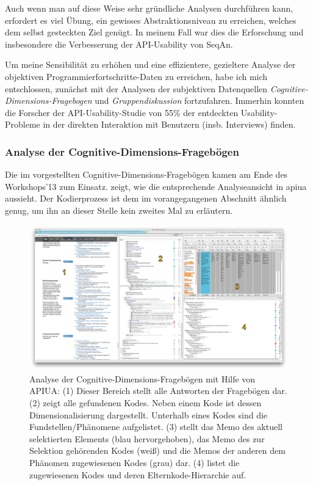 Auch wenn man auf diese Weise sehr gründliche Analysen durchführen kann, erfordert es viel Übung, ein gewisses Abstraktionsniveau zu erreichen, welches dem selbst gesteckten Ziel genügt. In meinem Fall war dies die Erforschung und insbesondere die Verbesserung der API-Usability von SeqAn.

Um meine Sensibilität zu erhöhen und eine effizientere, gezieltere Analyse der objektiven Programmierfortschritte-Daten zu erreichen, habe ich mich entschlossen, zunächst mit der Analysen der subjektiven Datenquellen \textit{Cognitive-Dimensions-Fragebogen} und \textit{Gruppendiskussion} fortzufahren. Immerhin konnten die Forscher der API-Usability-Studie von \cite{Grill:2012jm} 55\% der entdeckten Usability-Probleme in der direkten Interaktion mit Benutzern (insb. Interviews) finden.



\subsubsection{Analyse der Cognitive-Dimensions-Fragebögen}

Die im  vorgestellten Cognitive-Dimensions-Fragebögen kamen am Ende des Workshops'13 zum Einsatz.  zeigt, wie die entsprechende Analyseansicht in \gls{apiua} aussieht. Der Kodierprozess ist dem im vorangegangenen Abschnitt ähnlich genug, um ihn an dieser Stelle kein zweites Mal zu erläutern.

\begin{figure}
  \centering
    \includegraphics[width=1.0\linewidth]{Figures/research/workflow-cdf.png}
  \caption[Analyse der Cognitive-Dimensions-Fragebögen mit Hilfe von APIUA]{Analyse der Cognitive-Dimensions-Fragebögen mit Hilfe von APIUA: (1) Dieser Bereich stellt alle Antworten der Fragebögen dar. (2) zeigt alle gefundenen Kodes. Neben einem Kode ist dessen Dimensionalisierung dargestellt. Unterhalb eines Kodes sind die Fundstellen/Phänomene aufgelistet. (3) stellt das Memo des aktuell selektierten Elements (blau hervorgehoben), das Memo des zur Selektion gehörenden Kodes (weiß) und die Memos der anderen dem Phänomen zugewiesenen Kodes (grau) dar. (4) listet die zugewiesenen Kodes und deren Elternkode-Hierarchie auf.}
  \label{fig:research-workflow-cdf}
\end{figure}


